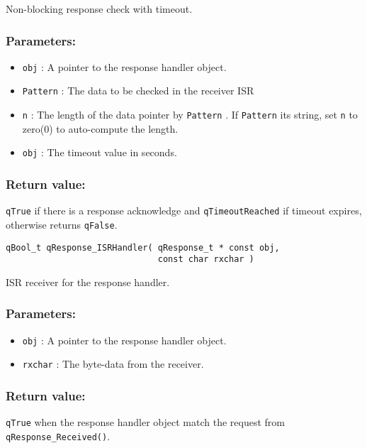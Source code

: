 Non-blocking response check with timeout. 

\subsubsection*{Parameters:}
\begin{itemize}
    \item \lstinline{obj} : A pointer to the response handler object.
    \item \lstinline{Pattern} : The data to be checked in the receiver ISR
    \item \lstinline{n} : The length of the data pointer by \lstinline{Pattern} . If \lstinline{Pattern} its string, set \lstinline{n} to zero(0) to auto-compute the length.
    \item \lstinline{obj} : The timeout value in seconds.
\end{itemize}

\subsubsection*{Return value:}
\lstinline{qTrue} if there is a response acknowledge and \lstinline{qTimeoutReached} if timeout expires,  otherwise returns \lstinline{qFalse}.

\noindent\hrulefill

\begin{lstlisting}[style=CStyle]
qBool_t qResponse_ISRHandler( qResponse_t * const obj, 
                              const char rxchar )
\end{lstlisting}

ISR receiver for the response handler. 

\subsubsection*{Parameters:}
\begin{itemize}
    \item \lstinline{obj} : A pointer to the response handler object.
    \item \lstinline{rxchar} : The byte-data from the receiver.
\end{itemize}

\subsubsection*{Return value:}
\lstinline{qTrue} when the response handler object match the request from \lstinline{qResponse_Received()}.

